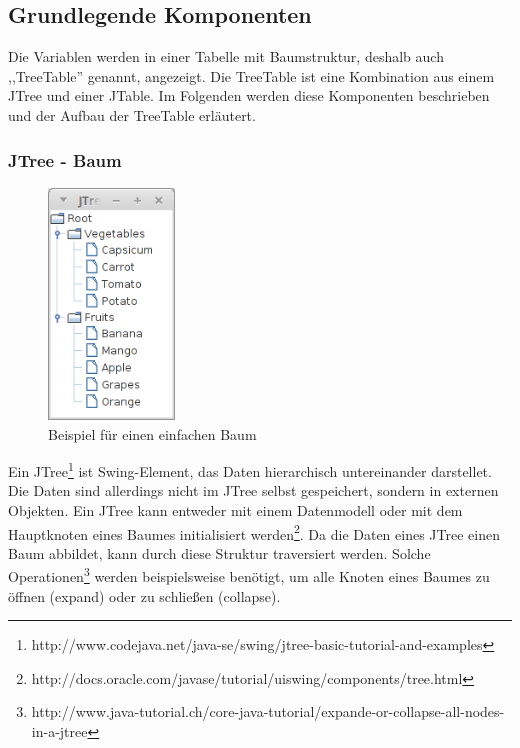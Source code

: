 
\subsection{Grundlegende Komponenten}
Die Variablen werden in einer Tabelle mit Baumstruktur, deshalb auch ,,TreeTable'' genannt, angezeigt. Die TreeTable ist eine Kombination aus einem JTree und einer JTable.
Im Folgenden werden diese Komponenten beschrieben und der Aufbau der TreeTable erläutert.

\subsubsection*{JTree - Baum}

\begin{figure}
  	\begin{center}
    	\includegraphics[width=0.3\textwidth]{./media/images/gui/debugger/JTree-Example.png}
  	\end{center}
  	\caption{Beispiel für einen einfachen Baum}
	\label{fig:deb-tt-example-jtree}
\end{figure}

Ein JTree\footnote{http://www.codejava.net/java-se/swing/jtree-basic-tutorial-and-examples} ist Swing-Element, das Daten hierarchisch untereinander darstellet. Die Daten sind allerdings nicht im JTree selbst gespeichert, sondern in externen Objekten. Ein JTree kann entweder mit einem Datenmodell oder mit dem Hauptknoten eines Baumes initialisiert werden\footnote{http://docs.oracle.com/javase/tutorial/uiswing/components/tree.html}. Da die Daten eines JTree einen Baum abbildet, kann durch diese Struktur traversiert werden. Solche Operationen\footnote{http://www.java-tutorial.ch/core-java-tutorial/expande-or-collapse-all-nodes-in-a-jtree} werden beispielsweise benötigt, um alle Knoten eines Baumes zu öffnen (expand) oder zu schließen (collapse).

